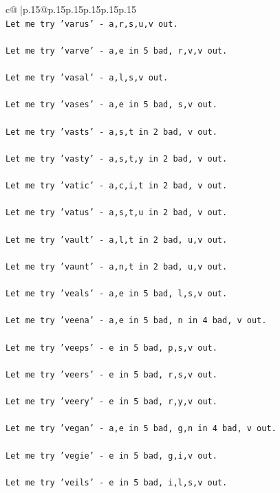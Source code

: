 \documentclass{article}
\begin{document}
{\begin{supertabular}{c@{$\;$}|p{.15\linewidth}@{}p{.15\linewidth}p{.15\linewidth}p{.15\linewidth}p{.15\linewidth}p{.15\linewidth}}
{{{\\ 
\texttt{Let me try 'varus' {-} a,r,s,u,v out. } \\
\\ 
\texttt{Let me try 'varve' {-} a,e in 5 bad, r,v,v out. } \\
\\ 
\texttt{Let me try 'vasal' {-} a,l,s,v out. } \\
\\ 
\texttt{Let me try 'vases' {-} a,e in 5 bad, s,v out. } \\
\\ 
\texttt{Let me try 'vasts' {-} a,s,t in 2 bad, v out. } \\
\\ 
\texttt{Let me try 'vasty' {-} a,s,t,y in 2 bad, v out. } \\
\\ 
\texttt{Let me try 'vatic' {-} a,c,i,t in 2 bad, v out. } \\
\\ 
\texttt{Let me try 'vatus' {-} a,s,t,u in 2 bad, v out. } \\
\\ 
\texttt{Let me try 'vault' {-} a,l,t in 2 bad, u,v out. } \\
\\ 
\texttt{Let me try 'vaunt' {-} a,n,t in 2 bad, u,v out. } \\
\\ 
\texttt{Let me try 'veals' {-} a,e in 5 bad, l,s,v out. } \\
\\ 
\texttt{Let me try 'veena' {-} a,e in 5 bad, n in 4 bad, v out. } \\
\\ 
\texttt{Let me try 'veeps' {-} e in 5 bad, p,s,v out. } \\
\\ 
\texttt{Let me try 'veers' {-} e in 5 bad, r,s,v out. } \\
\\ 
\texttt{Let me try 'veery' {-} e in 5 bad, r,y,v out. } \\
\\ 
\texttt{Let me try 'vegan' {-} a,e in 5 bad, g,n in 4 bad, v out. } \\
\\ 
\texttt{Let me try 'vegie' {-} e in 5 bad, g,i,v out. } \\
\\ 
\texttt{Let me try 'veils' {-} e in 5 bad, i,l,s,v out. } \\
\\ 
}}}
\end{supertabular}}
\end{document}

